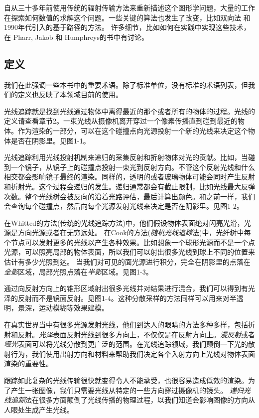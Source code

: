 \documentclass[12pt]{article}
\begin{document}
 自从三十多年前使用传统的辐射传输方法来重新描述这个图形学问题，大量的工作在探索如何数值的求解这个问题。一些关键的算法也发生了改变，比如双向法\cite{LW1993BPT,10.1007/978-3-642-87825-1_11} 和 1990年代引入的基于路径的方法\cite{Veach:1997:MLT:258734.258775}。
许多细节，比如如何在实践中实现这些技术，在 Pharr, Jakob 和 Humphreys的书\cite{pharr2016physically}中有讨论。


\subsection{定义}
我们在此强调一些本书中的重要术语。除了标准单位，没有标准的术语列表，但我们的定义也反映了本领域目前的使用。
 
光线追踪就是找到光线通过物体中离得最近的那个或者所有的物体的过程。光线的定义请查看章节2。一束光线从摄像机离开穿过一个像素传播直到碰到最近的物体。作为渲染的一部分，可以在这个碰撞点向光源投射一个新的光线来决定这个物体是否在阴影里。见图1-1。
 
光线追踪利用光线投射机制来递归的采集反射和折射物体对光的贡献。比如，当碰到一个镜子，从镜子上的碰撞点投射一束光到反射方向。不管这个反射光线和什么相交都会影响镜子最终的渲染。同样的，透明的或者玻璃物体可能会同时产生反射和折射光。这个过程会递归的发生。递归通常都会有截止限制，比如光线最大反弹次数。整个光线树会被反向的沿着光路评估，最后计算出颜色。和之前一样，我们会查询每个碰撞点，然后向每个光源发射光线来决定是否在阴影里。见图1-2。

在Whitted的方法(传统的光线追踪方法)中，他们假设物体表面绝对闪亮光滑，光源是方向光源或者在无穷远处。 在Cook的方法(\textit{随机光线追踪}法)中，光纤树中每个节点可以发射更多的光线以产生各种效果。比如想象一个球形光源而不是一个点光源，可以照亮局部的物体表面，所以我们可以射出很多光线到球上不同的位置来估计有多少光照到达。 当我们对可见的面光源进行积分，完全在阴影里的点落在\textit{全影}区域，局部光照点落在\textit{半影}区域。见图1-3。

通过向反射方向上的锥形区域射出很多光线并对结果进行混合，我们可以得到有光泽的反射而不是镜面反射。见图1-4。这种分散采样的方法同样可以用来对半透明，景深，运动模糊等效果建模。

在真实世界当中有很多光源发射光线，他们到达人的眼睛的方法多种多样，包括折射和反射。\textit{光泽}表面反射光线到很多方向上，不仅仅是在反射方向上。\textit{漫反射}或者\textit{哑光}表面可以将光线分散到更广泛的范围。在光线追踪领域，我们颠倒一下光的散射行为，我们使用出射方向和材料来帮助我们决定各个入射方向上光线对物体表面渲染的重要性。

跟踪如此复杂的光线传输很快就变得令人不能承受，也很容易造成低效的渲染。为了产生一张图像，我们只需要光线从特定的一些方向穿过摄像机的镜头。 \textit{递归光线追踪}法在很多方面颠倒了光线传播的物理过程，以我们知道会影响图像的方向从人眼处生成产生光线。
\end{document}
